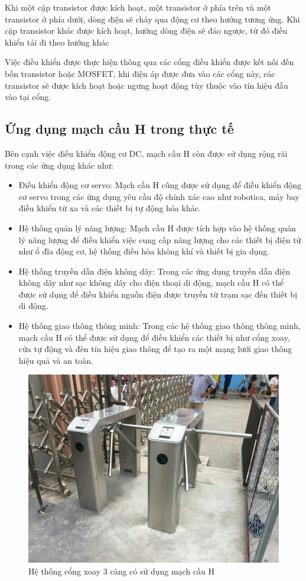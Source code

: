 \documentclass{article}
\begin{document}
Khi một cặp transistor được kích hoạt, một transistor ở phía trên và một transistor ở phía dưới, dòng điện sẽ chảy qua động cơ theo hướng tương ứng. Khi cặp transistor khác được kích hoạt, hướng dòng điện sẽ đảo ngược, từ đó điều khiển tải đi theo hướng khác

Việc điều khiển được thực hiện thông qua các cổng điều khiển được kết nối đến bồn transistor hoặc MOSFET, khi điện áp được đưa vào các cổng này, các transistor sẽ được kích hoạt hoặc ngưng hoạt động tùy thuộc vào tín hiệu đầu vào tại cổng.
\cleardoublepage
\subsection{Ứng dụng mạch cầu H trong thực tế}
Bên cạnh việc điều khiển động cơ DC, mạch cầu H còn được sử dụng rộng rãi trong các ứng dụng khác như:
\begin{itemize}
    \item Điều khiển động cơ servo: Mạch cầu H cũng được sử dụng để điều khiển động cơ servo trong các ứng dụng yêu cầu độ chính xác cao như robotica, máy bay điều khiển từ xa và các thiết bị tự động hóa khác.
    \item Hệ thống quản lý năng lượng: Mạch cầu H được tích hợp vào hệ thống quản lý năng lượng để điều khiển việc cung cấp năng lượng cho các thiết bị điện tử như ổ đĩa động cơ, hệ thống điều hòa không khí và thiết bị gia dụng.
    \item Hệ thống truyền dẫn điện không dây: Trong các ứng dụng truyền dẫn điện không dây như sạc không dây cho điện thoại di động, mạch cầu H có thể được sử dụng để điều khiển nguồn điện được truyền từ trạm sạc đến thiết bị di động.
    \item Hệ thống giao thông thông minh: Trong các hệ thống giao thông thông minh, mạch cầu H có thể được sử dụng để điều khiển các thiết bị như cổng xoay, cửa tự động và đèn tín hiệu giao thông để tạo ra một mạng lưới giao thông hiệu quả và an toàn.
\end{itemize}
\begin{figure}[H]
    \centering
    \includegraphics[width=1\textwidth]{image/cong3que.png}
    \caption{Hệ thống cổng xoay 3 càng có sử dụng mạch cầu H}
    \label{fig:hbridge}
\end{figure}
\cleardoublepage
\end{document}
